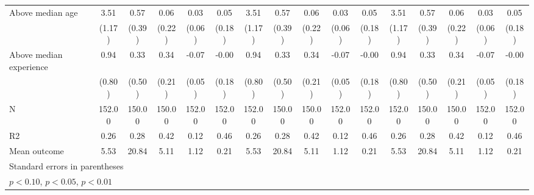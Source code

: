 {\begin{tabular}{l*{15}{c}}
Above median age&        3.51\sym{***}&        0.57         &        0.06         &        0.03         &        0.05         &        3.51\sym{***}&        0.57         &        0.06         &        0.03         &        0.05         &        3.51\sym{***}&        0.57         &        0.06         &        0.03         &        0.05         \\
            &      (1.17)         &      (0.39)         &      (0.22)         &      (0.06)         &      (0.18)         &      (1.17)         &      (0.39)         &      (0.22)         &      (0.06)         &      (0.18)         &      (1.17)         &      (0.39)         &      (0.22)         &      (0.06)         &      (0.18)         \\
\addlinespace
Above median experience&        0.94         &        0.33         &        0.34         &       -0.07         &       -0.00         &        0.94         &        0.33         &        0.34         &       -0.07         &       -0.00         &        0.94         &        0.33         &        0.34         &       -0.07         &       -0.00         \\
            &      (0.80)         &      (0.50)         &      (0.21)         &      (0.05)         &      (0.18)         &      (0.80)         &      (0.50)         &      (0.21)         &      (0.05)         &      (0.18)         &      (0.80)         &      (0.50)         &      (0.21)         &      (0.05)         &      (0.18)         \\
\midrule
N           &      152.00         &      150.00         &      150.00         &      152.00         &      152.00         &      152.00         &      150.00         &      150.00         &      152.00         &      152.00         &      152.00         &      150.00         &      150.00         &      152.00         &      152.00         \\
R2          &        0.26         &        0.28         &        0.42         &        0.12         &        0.46         &        0.26         &        0.28         &        0.42         &        0.12         &        0.46         &        0.26         &        0.28         &        0.42         &        0.12         &        0.46         \\
Mean outcome&        5.53         &       20.84         &        5.11         &        1.12         &        0.21         &        5.53         &       20.84         &        5.11         &        1.12         &        0.21         &        5.53         &       20.84         &        5.11         &        1.12         &        0.21         \\
\bottomrule
\multicolumn{16}{l}{\footnotesize Standard errors in parentheses}\\
\multicolumn{16}{l}{\footnotesize \sym{*} \(p<0.10\), \sym{**} \(p<0.05\), \sym{***} \(p<0.01\)}\\
\end{tabular}
}
